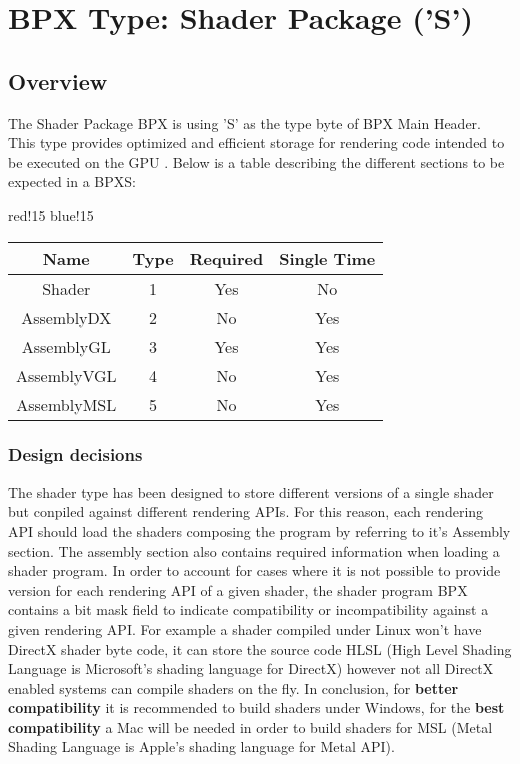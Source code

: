 \section{BPX Type: Shader Package ('S')}

\subsection{Overview}
The Shader Package BPX is using 'S' as the type byte of BPX Main Header. This type provides optimized and efficient storage for rendering code intended to be executed on the GPU \cite{GPU}.
\newline
Below is a table describing the different sections to be expected in a BPXS:
\begin{center}
    {
        {red!15}
        {blue!15}
        \begin{tabular}{|c|c|c|c|}
            \hline
            \textbf{Name} & \textbf{Type} & \textbf{Required} & \textbf{Single Time} \\
    
            \hline\hline
            Shader & 1 & Yes & No \\
            AssemblyDX & 2 & No & Yes \\
            AssemblyGL & 3 & Yes & Yes \\
            AssemblyVGL & 4 & No & Yes \\
            AssemblyMSL & 5 & No & Yes \\
            \hline
        \end{tabular}
    }
\end{center}

\subsubsection{Design decisions}
The shader type has been designed to store different versions of a single shader but conpiled against different rendering APIs.\newline
For this reason, each rendering API should load the shaders composing the program by referring to it's Assembly section.\newline
The assembly section also contains required information when loading a shader program.\newline
In order to account for cases where it is not possible to provide version for each rendering API of a given shader, the shader program BPX contains a bit mask field to indicate compatibility or incompatibility against a given rendering API.\newline
For example a shader compiled under Linux won't have DirectX shader byte code, it can store the source code HLSL (High Level Shading Language is Microsoft's shading language for DirectX) however not all DirectX enabled systems can compile shaders on the fly.\newline
In conclusion, for \textbf{better compatibility} it is recommended to build shaders under Windows, for the \textbf{best compatibility} a Mac will be needed in order to build shaders for MSL (Metal Shading Language is Apple's shading language for Metal API).

